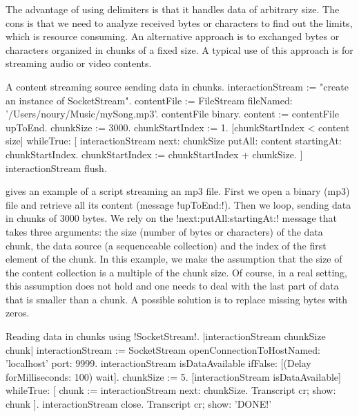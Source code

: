 \documentclass[a4paper,10pt,twoside]{book}
\begin{document}

The advantage of using delimiters is that it handles data of arbitrary size.
The cons is that we need to analyze received bytes or characters to find out the limits, which is resource consuming.
An alternative approach is to exchanged bytes or characters organized in chunks of a fixed size.
A typical use of this approach is for streaming audio or video contents.

\begin{script}{A content streaming source sending data in chunks.}
interactionStream := "create an instance of SocketStream". 
contentFile := FileStream fileNamed: '/Users/noury/Music/mySong.mp3'.
contentFile binary.
content := contentFile upToEnd.
chunkSize := 3000.
chunkStartIndex := 1.
[chunkStartIndex < content size] whileTrue: [
	interactionStream next: chunkSize putAll: content startingAt: chunkStartIndex.
	chunkStartIndex := chunkStartIndex + chunkSize.
]
interactionStream flush.
\end{script}

 gives an example of a script streaming an mp3 file.
First we open a binary (mp3) file and retrieve all its content (message \ct!upToEnd:!).
Then we loop, sending data in chunks of 3000 bytes.
We rely on the \ct!next:putAll:startingAt:! message that takes three arguments: the size (number of bytes or characters) of the data chunk,
the data source (a sequenceable collection) and the index of the first element of the chunk.
In this example, we make the assumption that the size of the content collection is a multiple of the chunk size.
Of course, in a real setting, this assumption does not hold and one needs to deal with the last part of data that is smaller than a chunk.
A possible solution is to replace missing bytes with zeros.

\begin{script}{Reading data in chunks using \ct!SocketStream!.}
	|interactionStream chunkSize chunk|
	interactionStream := SocketStream 
											openConnectionToHostNamed: 'localhost' port: 9999.
	interactionStream isDataAvailable ifFalse: [(Delay forMilliseconds: 100) wait].
	chunkSize := 5.
	[interactionStream isDataAvailable] whileTrue: [
		chunk  :=  interactionStream next: chunkSize.
		Transcript cr; show: chunk
	].
	interactionStream close.
	Transcript cr; show: 'DONE!'
\end{script}
\end{document}
